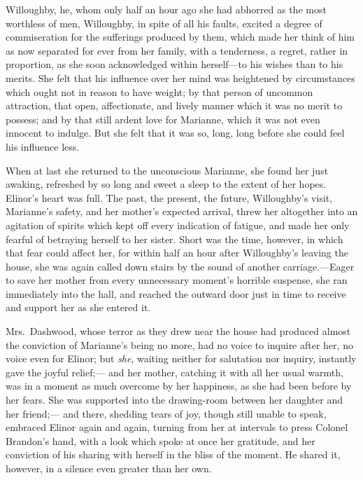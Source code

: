 Willoughby, he, whom only half an hour ago she had
abhorred as the most worthless of men, Willoughby, in spite
of all his faults, excited a degree of commiseration
for the sufferings produced by them, which made her
think of him as now separated for ever from her family,
with a tenderness, a regret, rather in proportion, as she
soon acknowledged within herself---to his wishes than to
his merits.  She felt that his influence over her mind
was heightened by circumstances which ought not in reason
to have weight; by that person of uncommon attraction,
that open, affectionate, and lively manner which it
was no merit to possess; and by that still ardent love
for Marianne, which it was not even innocent to indulge.
But she felt that it was so, long, long before she could
feel his influence less.

When at last she returned to the unconscious Marianne,
she found her just awaking, refreshed by so long and sweet
a sleep to the extent of her hopes.  Elinor's heart was full.
The past, the present, the future, Willoughby's visit,
Marianne's safety, and her mother's expected arrival,
threw her altogether into an agitation of spirits
which kept off every indication of fatigue, and made
her only fearful of betraying herself to her sister.
Short was the time, however, in which that fear could
affect her, for within half an hour after Willoughby's
leaving the house, she was again called down stairs
by the sound of another carriage.---Eager to save her
mother from every unnecessary moment's horrible suspense,
she ran immediately into the hall, and reached the outward
door just in time to receive and support her as she entered it.

Mrs.\ Dashwood, whose terror as they drew near the
house had produced almost the conviction of Marianne's
being no more, had no voice to inquire after her,
no voice even for Elinor; but \emph{she}, waiting neither for
salutation nor inquiry, instantly gave the joyful relief;---%
and her mother, catching it with all her usual warmth,
was in a moment as much overcome by her happiness, as she
had been before by her fears.  She was supported into
the drawing-room between her daughter and her friend;---%
and there, shedding tears of joy, though still unable
to speak, embraced Elinor again and again, turning from her
at intervals to press Colonel Brandon's hand, with a look
which spoke at once her gratitude, and her conviction
of his sharing with herself in the bliss of the moment.
He shared it, however, in a silence even greater than her own.

